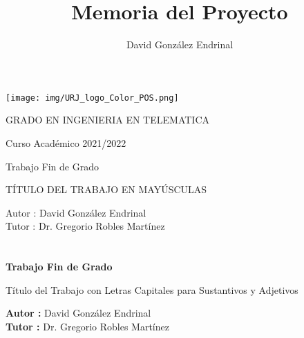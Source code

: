 \documentclass[a4paper, 12pt]{book}
\title{Memoria del Proyecto}
\author{David González Endrinal}
\begin{document}
\renewcommand{\refname}{Bibliografía}  %
\renewcommand{\appendixname}{Apéndice}


\begin{titlepage}
\begin{center}
\texttt{[image: img/URJ\_logo\_Color\_POS.png]}

\vspace{1.75cm}

\Large
GRADO EN INGENIERIA EN TELEMATICA

\vspace{0.4cm}

\large
Curso Académico 2021/2022

\vspace{0.8cm}

Trabajo Fin de Grado

\vspace{2.5cm}

\LARGE
TÍTULO DEL TRABAJO EN MAYÚSCULAS

\vspace{4cm}

\large
Autor : David González Endrinal \\
Tutor : Dr. Gregorio Robles Martínez
\end{center}
\end{titlepage}

\newpage
\mbox{}
\thispagestyle{empty} %


\clearpage
{}
\chapter*{}

\vspace{-4cm}
\begin{center}
\LARGE
\textbf{Trabajo Fin de Grado}

\vspace{1cm}
\large
Título del Trabajo con Letras Capitales para Sustantivos y Adjetivos

\vspace{1cm}
\large
\textbf{Autor :} David González Endrinal \\
\textbf{Tutor :} Dr. Gregorio Robles Martínez

\end{center}
\end{document}
